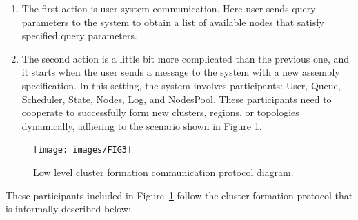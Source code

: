 \begin{enumerate}[start=1,label={(\bfseries \arabic*)}]
	\item The first action is user-system communication. Here user sends query parameters to the system to obtain a list of available nodes that satisfy specified query parameters.
	\item The second action is a little bit more complicated than the previous one, and it starts when the user sends a message to the system with a new assembly specification. In this setting, the system involves participants: User, Queue, Scheduler, State, Nodes, Log, and NodesPool. These participants need to cooperate to successfully form new clusters, regions, or topologies dynamically, adhering to the scenario shown in Figure \ref{fig:fig7}.
\end{enumerate} 

\begin{figure}[H]
	\begin{center}
		\texttt{[image: images/FIG3]}
	\end{center}
	\vspace{-0.7cm}
	\caption{Low level cluster formation communication protocol diagram.}
	\label{fig:fig7}
\end{figure}

\noindent
These participants included in Figure~\ref{fig:fig7} follow the cluster formation protocol that is informally described below:

